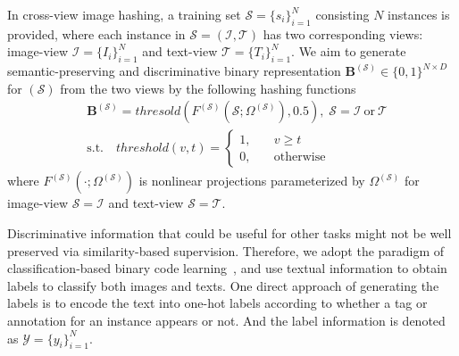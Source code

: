 \documentclass[10pt,twocolumn,letterpaper]{article}
\begin{document}
In cross-view image hashing, a training set $\mathcal{S} = \{s_i\}_{i=1}^N$ consisting $N$ instances is provided, where each instance in $\mathcal{S}=(\mathcal{I},\mathcal{T})$ has two corresponding views: image-view $\mathcal{I}=\{I_i\}_{i=1}^N$ and text-view $\mathcal{T}=\{T_i\}_{i=1}^N$. We aim to generate semantic-preserving and discriminative binary representation $\mathbf{B}^{(\mathcal{S})}\in \{0,1\}^{N\times D}$ for ${(\mathcal{S})}$ from the two views by the following hashing functions
\begin{align}\label{eq:hash}
&\mathbf{B}^{(\mathcal{S})} = thresold(F^{(\mathcal{S})}(\mathcal{S};\Omega^{(\mathcal{S})}),0.5),\; \mathcal{S} = \mathcal{I}\ \text{or}\ \mathcal{T}\\
&\text{s.t.}\quad threshold(v,t) =
	\begin{cases}
	1,&\quad v\geq t\\
	0,&\quad \text{otherwise}
	\end{cases}\nonumber
\end{align}
where $F^{(\mathcal{S})}(\cdot;\Omega^{(\mathcal{S})})$ is nonlinear projections parameterized by $\Omega^{(\mathcal{S})}$ for image-view $\mathcal{S} = \mathcal{I}$ and text-view $\mathcal{S} = \mathcal{T}$.

Discriminative information that could be useful for other tasks might not be well preserved via similarity-based supervision. Therefore, we adopt the paradigm of classification-based binary code learning~\cite{Shen_2015_CVPR,dbe}, and use textual information to obtain labels to classify both images and texts. One direct approach of generating the labels is to encode the text into one-hot labels according to whether a tag or annotation for an instance appears or not. And the label information is denoted as $\mathcal{Y} = \{y_i\}_{i=1}^N$.
\end{document}
